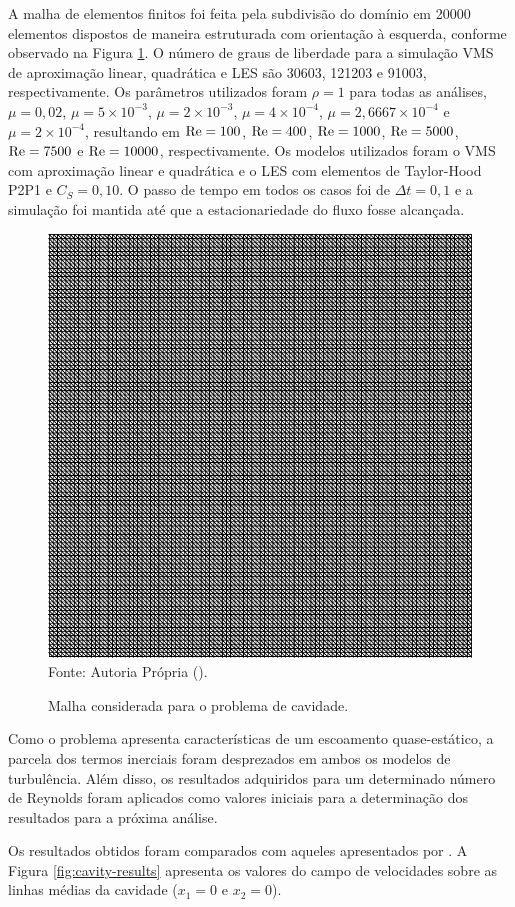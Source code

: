 A malha de elementos finitos foi feita pela subdivisão do domínio em 20000 elementos dispostos de maneira estruturada com orientação à esquerda, conforme observado na Figura \ref{fig:cavity_disc}. O número de graus de liberdade para a simulação VMS de aproximação linear, quadrática e LES são 30603, 121203 e 91003, respectivamente. Os parâmetros utilizados foram $\rho=1$ para todas as análises, $\mu=0,02$, $\mu=5\times10^{-3}$, $\mu=2\times10^{-3}$, $\mu=4\times10^{-4}$, $\mu=2,6667\times10^{-4}$ e $\mu=2\times10^{-4}$, resultando em $\mathrm{Re}=100$, $\mathrm{Re}=400$, $\mathrm{Re}=1000$, $\mathrm{Re}=5000$, $\mathrm{Re}=7500$ e $\mathrm{Re}=10000$, respectivamente. Os modelos utilizados foram o VMS com aproximação linear e quadrática e o LES com elementos de Taylor-Hood P2P1 e $C_S=0,10$. O passo de tempo em todos os casos foi de $\Delta t=0,1$ e a simulação foi mantida até que a estacionariedade do fluxo fosse alcançada.

\begin{figure}[h!]
    \centering
    \caption{Malha considerada para o problema de cavidade.}
    \includegraphics[width=.6\linewidth]{Figuras/Cavity/mesh.pdf}
    \\Fonte: Autoria Própria (\the\year).
    \label{fig:cavity_disc}
\end{figure}

Como o problema apresenta características de um escoamento quase-estático, a parcela dos termos inerciais foram desprezados em ambos os modelos de turbulência. Além disso, os resultados adquiridos para um determinado número de Reynolds foram aplicados como valores iniciais para a determinação dos resultados para a próxima análise.

Os resultados obtidos foram comparados com aqueles apresentados por . A Figura \ref{fig:cavity-results} apresenta os valores do campo de velocidades sobre as linhas médias da cavidade ($x_1=0$ e $x_2=0$).

